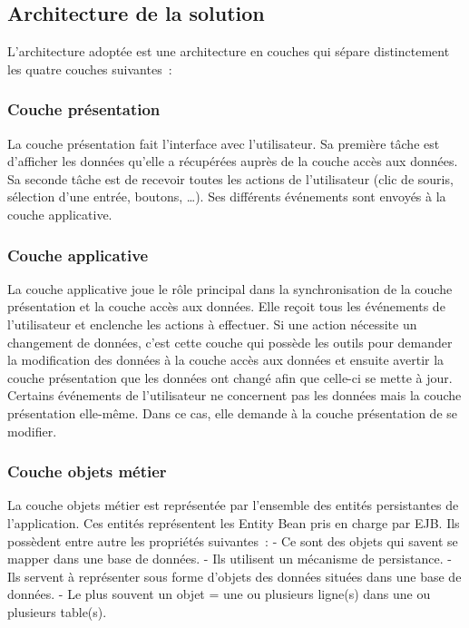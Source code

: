 \documentclass[a4paper, title]{report}
\let\oldparagraph\subsubsection
\renewcommand{\subsubsection}[1]{\oldparagraph{#1}\mbox{}}
\begin{document}
\subsection{Architecture de la solution}\label{architecture-de-la-solution}

L'architecture adoptée est une architecture en couches qui sépare
distinctement les quatre couches suivantes~:

\subsubsection{Couche présentation}\label{couche-presentation}

La couche présentation fait l'interface avec l'utilisateur. Sa première
tâche est d'afficher les données qu'elle a récupérées auprès de la
couche accès aux données. Sa seconde tâche est de recevoir toutes les
actions de l'utilisateur (clic de souris, sélection d'une entrée,
boutons, \ldots{}). Ses différents événements sont envoyés à la couche
applicative.

\subsubsection{Couche applicative}\label{couche applicative}

La couche applicative joue le rôle principal dans la synchronisation de
la couche présentation et la couche accès aux données. Elle reçoit tous
les événements de l'utilisateur et enclenche les actions à effectuer. Si
une action nécessite un changement de données, c'est cette couche qui
possède les outils pour demander la modification des données à la couche
accès aux données et ensuite avertir la couche présentation que les
données ont changé afin que celle-ci se mette à jour. Certains
événements de l'utilisateur ne concernent pas les données mais la couche
présentation elle-même. Dans ce cas, elle demande à la couche
présentation de se modifier.

\subsubsection{Couche objets métier}\label{couche-objets-muxe9tier}

La couche objets métier est représentée par l'ensemble des entités
persistantes de l'application. Ces entités représentent les Entity Bean
pris en charge par EJB. Ils possèdent entre autre les propriétés
suivantes~: - Ce sont des objets qui savent se mapper dans une base de
données. - Ils utilisent un mécanisme de persistance. - Ils servent à
représenter sous forme d'objets des données situées dans une base de
données. - Le plus souvent un objet = une ou plusieurs ligne(s) dans une
ou plusieurs table(s).
\end{document}
